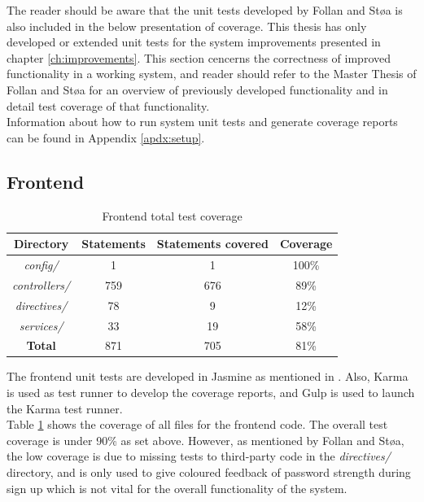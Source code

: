 The reader should be aware that the unit tests developed by Follan and Støa is also included in the below presentation of coverage. This thesis has only developed or extended unit tests for the system improvements presented in chapter \ref{ch:improvements}. This section cencerns the correctness of improved functionality in a working system, and reader should refer to the Master Thesis of Follan and Støa for an overview of previously developed functionality and in detail test coverage of that functionality.  \\

Information about how to run system unit tests and generate coverage reports can be found in Appendix \ref{apdx:setup}.

\subsection{Frontend}
\begin{table}[h!]
    \centering
    \begin{tabular}{c c c c}
      \hline
      \textbf{Directory} & \textbf{Statements} & \textbf{Statements covered} & \textbf{Coverage} \\ \hline
      \textit{config/} & 1 & 1 & 100\% \\
      \textit{controllers/} & 759 & 676 & 89\% \\
      \textit{directives/} & 78 & 9 & 12\% \\
      \textit{services/} & 33 & 19 & 58\% \\ \hline
      \textbf{Total} & 871 & 705 & 81\% \\ \hline
    \end{tabular}
    \caption{Frontend total test coverage}
    \label{tab:frontend-coverage-all}
\end{table}

The frontend unit tests are developed in Jasmine \cite{JASMINE} as mentioned in . Also, Karma \cite{KARMA} is used as test runner to develop the coverage reports, and Gulp \cite{GULP} is used to launch the Karma test runner.  \\

Table \ref{tab:frontend-coverage-all} shows the coverage of all files for the frontend code. The overall test coverage is under 90\% as set above. However, as mentioned by Follan and Støa, the low coverage is due to missing tests to third-party code in the \textit{directives/} directory, and is only used to give coloured feedback of password strength during sign up which is not vital for the overall functionality of the system. \\

